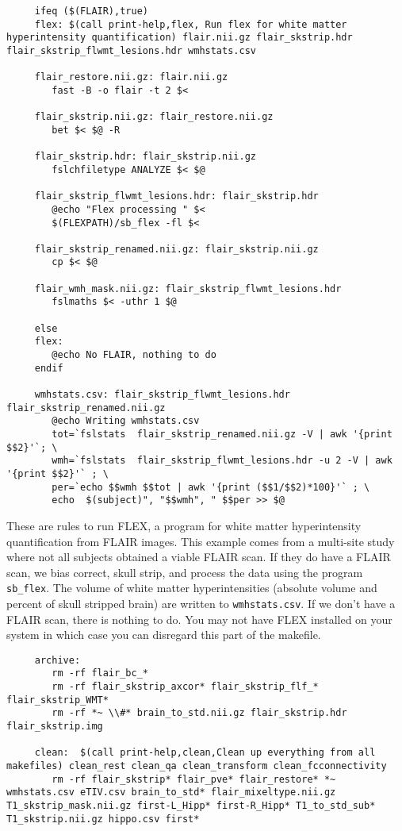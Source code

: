 \begin{lstlisting}
	 ifeq ($(FLAIR),true)
	 flex: $(call print-help,flex, Run flex for white matter hyperintensity quantification) flair.nii.gz flair_skstrip.hdr flair_skstrip_flwmt_lesions.hdr wmhstats.csv

	 flair_restore.nii.gz: flair.nii.gz
		fast -B -o flair -t 2 $<

	 flair_skstrip.nii.gz: flair_restore.nii.gz
		bet $< $@ -R

	 flair_skstrip.hdr: flair_skstrip.nii.gz 
		fslchfiletype ANALYZE $< $@

	 flair_skstrip_flwmt_lesions.hdr: flair_skstrip.hdr
		@echo "Flex processing " $< 
		$(FLEXPATH)/sb_flex -fl $< 

	 flair_skstrip_renamed.nii.gz: flair_skstrip.nii.gz
		cp $< $@

	 flair_wmh_mask.nii.gz: flair_skstrip_flwmt_lesions.hdr
		fslmaths $< -uthr 1 $@

	 else
	 flex:
		@echo No FLAIR, nothing to do
	 endif

	 wmhstats.csv: flair_skstrip_flwmt_lesions.hdr flair_skstrip_renamed.nii.gz
		@echo Writing wmhstats.csv 
		tot=`fslstats  flair_skstrip_renamed.nii.gz -V | awk '{print $$2}'`; \
		wmh=`fslstats  flair_skstrip_flwmt_lesions.hdr -u 2 -V | awk '{print $$2}'` ; \
		per=`echo $$wmh $$tot | awk '{print ($$1/$$2)*100}'` ; \
		echo  $(subject)", "$$wmh", " $$per >> $@ 
\end{lstlisting}

These are rules to run FLEX, a program for white matter hyperintensity
quantification from FLAIR images. This example comes from a multi-site
study where not all subjects obtained a viable FLAIR scan. If they do
have a FLAIR scan, we bias correct, skull strip, and process the data
using the program \texttt{sb_flex}.  The volume of white
matter hyperintensities (absolute volume and percent of skull stripped
brain) are written to \texttt{wmhstats.csv}. If we don't have a FLAIR
scan, there is nothing to do. You may not have FLEX installed on your
system in which case you can disregard this part of the makefile.


\begin{lstlisting}
	 archive:
		rm -rf flair_bc_*
		rm -rf flair_skstrip_axcor* flair_skstrip_flf_* flair_skstrip_WMT*
		rm -rf *~ \\#* brain_to_std.nii.gz flair_skstrip.hdr flair_skstrip.img

	 clean:  $(call print-help,clean,Clean up everything from all makefiles) clean_rest clean_qa clean_transform clean_fcconnectivity
		rm -rf flair_skstrip* flair_pve* flair_restore* *~ wmhstats.csv eTIV.csv brain_to_std* flair_mixeltype.nii.gz T1_skstrip_mask.nii.gz first-L_Hipp* first-R_Hipp* T1_to_std_sub* T1_skstrip.nii.gz hippo.csv first*
\end{lstlisting}

